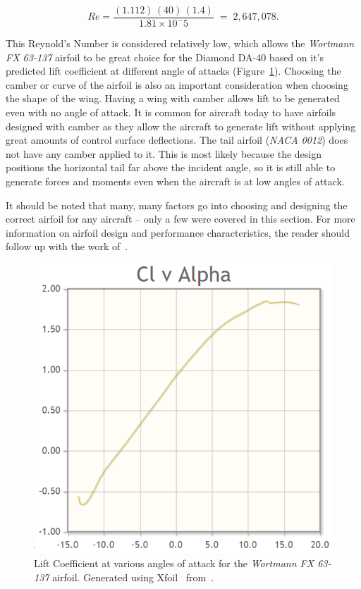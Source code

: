 \begin{equation}\label{eq:recalc}
    Re = \frac{(1.112) \, (40) \, (1.4)}{1.81\times10^-5} \; = \;  2,647,078.
\end{equation}

This Reynold's Number is considered relatively low, which allows the \textit{Wortmann FX 63{-}137} airfoil to be great choice for the Diamond DA-40 based on it's predicted lift coefficient at different angle of attacks (Figure~\ref{fig:xfoil}). Choosing the camber or curve of the airfoil is also an important consideration when choosing the shape of the wing. Having a wing with camber allows lift to be generated even with no angle of attack. It is common for aircraft today to have airfoils designed with camber as they allow the aircraft to generate lift without applying great amounts of control surface deflections. The tail airfoil (\textit{NACA 0012}) does not have any camber applied to it. This is most likely because the design positions the horizontal tail far above the incident angle, so it is still able to generate forces and moments even when the aircraft is at low angles of attack.

It should be noted that many, many factors go into choosing and designing the correct airfoil for any aircraft {--} only a few were covered in this section. For more information on airfoil design and performance characteristics, the reader should follow up with the work of~\cite{972HowAirfoil,AerodynamicsforengineersJohnBertin}.

\begin{figure}[!ht]\label{fig:xfoil}
    \centering
    \includegraphics[width=0.5\linewidth]{Figures/liftvsalpha.png}
    \caption{Lift Coefficient at various angles of attack for the \textit{Wortmann FX 63{-}137} airfoil. Generated using Xfoil~\cite{drelaXfoilSubsonicAirfoil} from~\cite{WORTMANNFX63137}.}
\end{figure}

